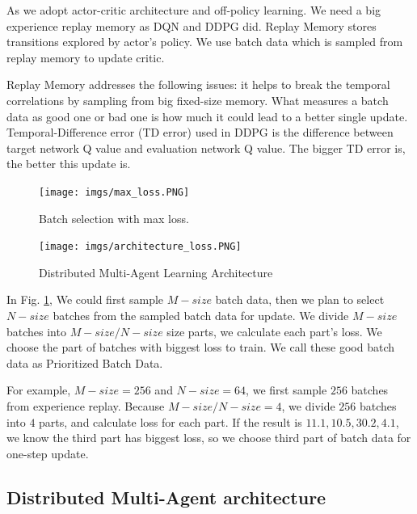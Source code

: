 \documentclass[11pt,twocolumn]{jarticle} %
\begin{document}
As we adopt actor-critic architecture and off-policy learning. We need a big experience replay memory as DQN and DDPG did. Replay Memory stores transitions explored by actor's policy. We use batch data which is sampled from replay memory to update critic. \par 
Replay Memory addresses the following issues: it helps to break the temporal correlations by sampling from big fixed-size memory. What measures a batch data as good one or bad one is how much it could lead to a better single update. Temporal-Difference error (TD error) used in DDPG is the difference between target network Q value and evaluation network Q value. The bigger TD error is, the better this update is. \par
\begin{figure}[h]
 \begin{center}
  \texttt{[image: imgs/max\_loss.PNG]}
  \caption{
  Batch selection with max loss.
  }
  \label{fig:max_loss}
 \end{center}
\end{figure}

\begin{figure}[ht]
 \begin{center}
  \texttt{[image: imgs/architecture\_loss.PNG]}
  \caption{Distributed Multi-Agent Learning Architecture}
  \label{fig:architecture}
 \end{center}
\end{figure}
In Fig. \ref{fig:max_loss}, We could first sample $M-size$ batch data, then we plan to select $N-size$ batches from the sampled batch data for update. We divide $M-size$ batches into $M-size/N-size$ size parts, we calculate each part's loss. We choose the part of batches with biggest loss to train. We call these good batch data as Prioritized Batch Data. \par

For example, $M-size = 256$ and $N-size = 64$, we first sample $256$ batches from experience replay. Because $M-size/N-size = 4$, we divide $256$ batches into $4$ parts, and calculate loss for each part. If the result is {$11.1, 10.5, 30.2, 4.1$}, we know the third part has biggest loss, so we choose third part of batch data for one-step update. 

\subsection{Distributed Multi-Agent architecture}
\end{document}
